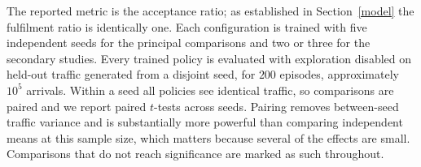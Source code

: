 \documentclass[10pt,journal,comsoc]{IEEEtran}
\begin{document}
The reported metric is the acceptance ratio; as established in
Section~\ref{model} the fulfilment ratio is identically one. Each
configuration is trained with five independent seeds for the principal
comparisons and two or three for the secondary studies. Every trained
policy is evaluated with exploration disabled on held-out traffic
generated from a disjoint seed, for $200$ episodes, approximately $10^5$
arrivals. Within a seed all policies see identical traffic, so comparisons
are paired and we report paired $t$-tests across seeds. Pairing removes
between-seed traffic variance and is substantially more powerful than
comparing independent means at this sample size, which matters because
several of the effects are small. Comparisons that do not reach
significance are marked as such throughout.
\end{document}
